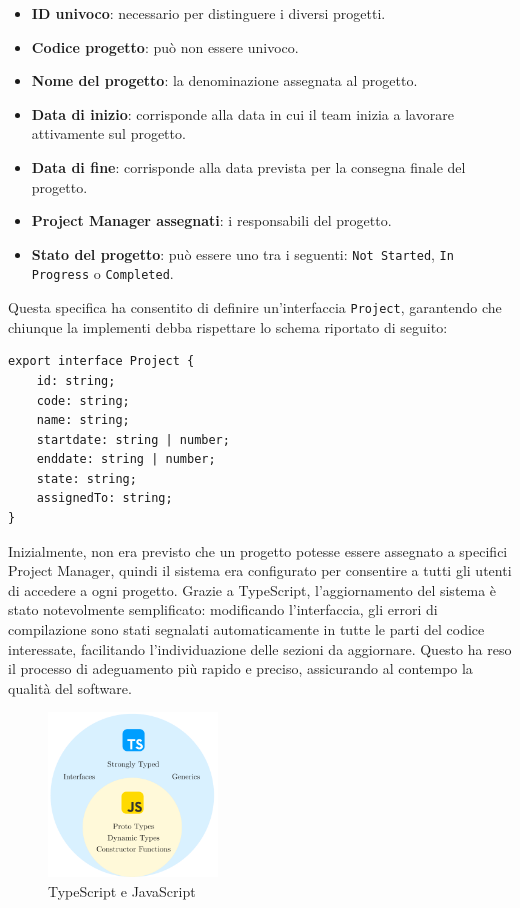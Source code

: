 \documentclass[target=bach,aauheader=,style=]{thud}
\begin{document}
\begin{itemize}
    \item \textbf{ID univoco}: necessario per distinguere i diversi progetti.
    \item \textbf{Codice progetto}: può non essere univoco.
    \item \textbf{Nome del progetto}: la denominazione assegnata al progetto.
    \item \textbf{Data di inizio}: corrisponde alla data in cui il team inizia a lavorare attivamente sul progetto.
    \item \textbf{Data di fine}: corrisponde alla data prevista per la consegna finale del progetto.
    \item \textbf{Project Manager assegnati}: i responsabili del progetto.
    \item \textbf{Stato del progetto}: può essere uno tra i seguenti: \texttt{Not Started}, \texttt{In Progress} o \texttt{Completed}.
    
\end{itemize}

\noindent Questa specifica ha consentito di definire un'interfaccia \texttt{Project}, garantendo che chiunque la implementi debba rispettare lo schema riportato di seguito:

\begin{lstlisting}[language=React, caption=Interfaccia di progetto]
export interface Project {
    id: string;
    code: string;
    name: string;
    startdate: string | number;
    enddate: string | number;
    state: string;
    assignedTo: string;
}
\end{lstlisting}

\noindent Inizialmente, non era previsto che un progetto potesse essere assegnato a specifici Project Manager, quindi il sistema era configurato per consentire a tutti gli utenti di accedere a ogni progetto. Grazie a TypeScript, l'aggiornamento del sistema è stato notevolmente semplificato: modificando l'interfaccia, gli errori di compilazione sono stati segnalati automaticamente in tutte le parti del codice interessate, facilitando l'individuazione delle sezioni da aggiornare. Questo ha reso il processo di adeguamento più rapido e preciso, assicurando al contempo la qualità del software.

\begin{figure}[H]
    \centering
    \includegraphics[width=0.4\textwidth]{img/typescript_and_javascript.pdf} 
    \caption{TypeScript e JavaScript}
\end{figure}
\end{document}
